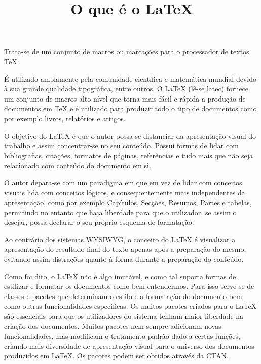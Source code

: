 \documentclass[12pt]{memoir}
\begin{document}
\title {O que é o \LaTeX}
\maketitle 

Trata-se de um conjunto de macros ou marcações para o processador de textos TeX.

É utilizado amplamente pela comunidade científica e matemática mundial
devido à sua grande qualidade tipográfica, entre outros. O LaTeX
(lê-se latec) fornece um conjunto de macros alto-nível que torna mais
fácil e rápida a produção de documentos em TeX e é utilizado para
produzir todo o tipo de documentos como por exemplo livros, relatórios
e artigos.

O objetivo do LaTeX é que o autor possa se distanciar da apresentação
visual do trabalho e assim concentrar-se no seu conteúdo. Possui
formas de lidar com bibliografias, citações, formatos de páginas,
referências e tudo mais que não seja relacionado com conteúdo do
documento em si.

O autor depara-se com um paradigma em que em vez de lidar com
conceitos visuais lida com conceitos lógicos, e consequentemente mais
independentes da apresentação, como por exemplo Capítulos,
Secções, Resumos, Partes e tabelas, permitindo no entanto que haja
liberdade para que o utilizador, se assim o desejar, possa declarar o
seu próprio esquema de formatação.

Ao contrário dos sistemas WYSIWYG, o conceito do LaTeX é visualizar a
apresentação do resultado final do texto apenas após a preparação do
mesmo, evitando assim distrações quanto à forma durante a preparação
do conteúdo.

Como foi dito, o LaTeX não é algo imutável, e como tal suporta formas
de estilizar e formatar os documentos como bem entendermos. Para isso
serve-se de classes e pacotes que determinam o estilo e a formatação
do documento bem como outras funcionalidades especificas. Os muitos
pacotes criados para o LaTeX são essenciais para que os utilizadores
do sistema tenham maior liberdade na criação dos documentos. Muitos
pacotes nem sempre adicionam novas funcionalidades, mas modificam o
tratamento padrão dado a certas funções, criando mais diversidade de
apresentação visual para o universo dos documentos produzidos em
LaTeX. Os pacotes podem ser obtidos através da CTAN.
\end{document}
